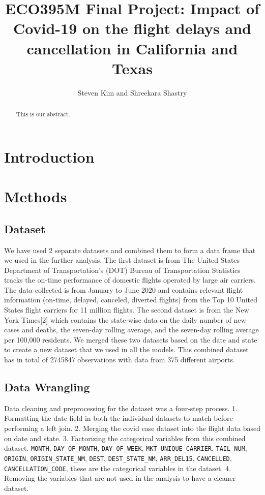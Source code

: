 \documentclass[
]{article}
\title{ECO395M Final Project: Impact of Covid-19 on the flight delays
and cancellation in California and Texas}
\author{Steven Kim and Shreekara Shastry}
\date{}
\begin{document}
\maketitle

\begin{titlepage}
\maketitle
\begin{abstract}
This is our abstract.
\end{abstract}
\thispagestyle{empty}
\end{titlepage}
\section{Introduction}
\section{Methods}
\subsection{Dataset}

We have used 2 separate datasets and combined them to form a data frame
that we used in the further analysis. The first dataset is from The
United States Department of Transportation's (DOT) Bureau of
Transportation Statistics tracks the on-time performance of domestic
flights operated by large air carriers. The data collected is from
January to June 2020 and contains relevant flight information (on-time,
delayed, canceled, diverted flights) from the Top 10 United States
flight carriers for 11 million flights. The second dataset is from the
New York Times{[}2{]} which contains the state-wise data on the daily
number of new cases and deaths, the seven-day rolling average, and the
seven-day rolling average per 100,000 residents. We merged these two
datasets based on the date and state to create a new dataset that we
used in all the models. This combined dataset has in total of 2745847
observations with data from 375 different airports.

\subsection{Data Wrangling}

Data cleaning and preprocessing for the dataset was a four-step process.
1. Formatting the date field in both the individual datasets to match
before performing a left join. 2. Merging the covid case dataset into
the flight data based on date and state. 3. Factorizing the categorical
variables from this combined dataset. \texttt{MONTH},
\texttt{DAY\_OF\_MONTH}, \texttt{DAY\_OF\_WEEK},
\texttt{MKT\_UNIQUE\_CARRIER}, \texttt{TAIL\_NUM}, \texttt{ORIGIN},
\texttt{ORIGIN\_STATE\_NM}, \texttt{DEST}, \texttt{DEST\_STATE\_NM},
\texttt{ARR\_DEL15}, \texttt{CANCELLED}, \texttt{CANCELLATION\_CODE},
these are the categorical variables in the dataset. 4. Removing the
variables that are not used in the analysis to have a cleaner dataset.
\end{document}
